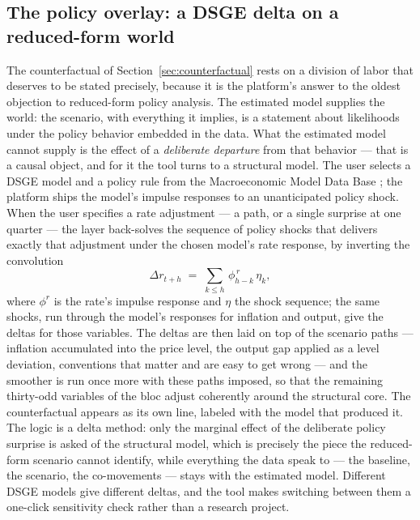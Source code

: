 \documentclass[11pt]{article}
\begin{document}
\subsection{The policy overlay: a DSGE delta on a reduced-form world}\label{sec:overlay}

The counterfactual of Section~\ref{sec:counterfactual} rests on a division of labor that
deserves to be stated precisely, because it is the platform's answer to the oldest
objection to reduced-form policy analysis. The estimated model supplies the world: the
scenario, with everything it implies, is a statement about likelihoods under the policy
behavior embedded in the data. What the estimated model cannot supply is the effect of a
\emph{deliberate departure} from that behavior --- that is a causal object, and for it the
tool turns to a structural model. The user selects a DSGE model and a policy rule from the
Macroeconomic Model Data Base \citep{WielandCwikMuellerSchmidtWolters2012}; the platform
ships the model's impulse responses to an unanticipated policy shock. When the user
specifies a rate adjustment --- a path, or a single surprise at one quarter --- the layer
back-solves the sequence of policy shocks that delivers exactly that adjustment under the
chosen model's rate response, by inverting the convolution
\begin{equation}\label{eq:delta}
  \Delta r_{t+h} \;=\; \textstyle\sum_{k\le h}\, \phi^{\,r}_{h-k}\,\eta_k,
\end{equation}
where $\phi^r$ is the rate's impulse response and $\eta$ the shock sequence; the same
shocks, run through the model's responses for inflation and output, give the deltas for
those variables. The deltas are then laid on top of the scenario paths --- inflation
accumulated into the price level, the output gap applied as a level deviation, conventions
that matter and are easy to get wrong --- and the smoother is run once more with these
paths imposed, so that the remaining thirty-odd variables of the bloc adjust coherently
around the structural core. The counterfactual appears as its own line, labeled with the
model that produced it. The logic is a delta method: only the marginal effect of the
deliberate policy surprise is asked of the structural model, which is precisely the piece
the reduced-form scenario cannot identify, while everything the data speak to --- the
baseline, the scenario, the co-movements --- stays with the estimated model. Different DSGE
models give different deltas, and the tool makes switching between them a one-click
sensitivity check rather than a research project.
\end{document}
